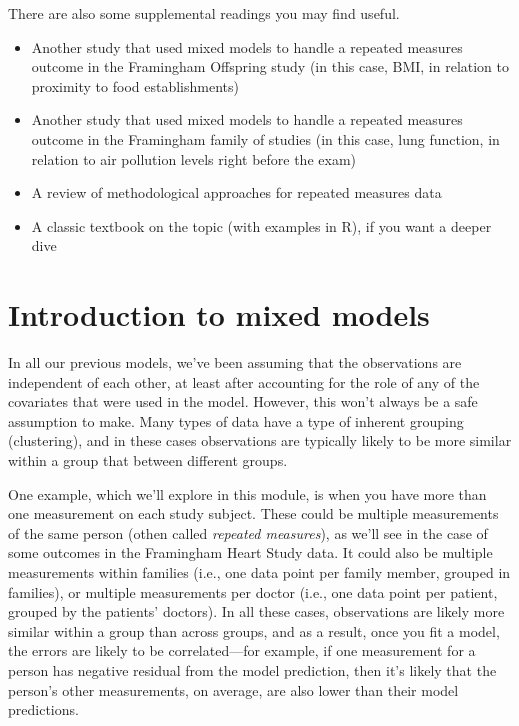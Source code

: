 \documentclass[
]{book}
\providecommand{\tightlist}{%
  \setlength{\itemsep}{0pt}\setlength{\parskip}{0pt}}
\begin{document}
There are also some supplemental readings you may find useful.

\begin{itemize}
\tightlist
\item
  \citet{block2011proximity} Another study that used mixed models to handle a repeated
  measures outcome in the Framingham Offspring study (in this case, BMI, in
  relation to proximity to food establishments)
\item
  \citet{rice2013short} Another study that used mixed models to handle a repeated
  measures outcome in the Framingham family of studies (in this case, lung
  function, in relation to air pollution levels right before the exam)
\item
  \citet{gibbons2010advances} A review of methodological approaches for repeated
  measures data
\item
  \citet{gelman2006data} A classic textbook on the topic (with examples in R), if you
  want a deeper dive
\end{itemize}

\hypertarget{introduction-to-mixed-models}{%
\section{Introduction to mixed models}\label{introduction-to-mixed-models}}

In all our previous models, we've been assuming that the observations are
independent of each other, at least after accounting for the role of any
of the covariates that were used in the model. However, this won't always
be a safe assumption to make. Many types of data have a type of inherent
grouping (clustering), and in these cases observations are typically likely to be more
similar within a group that between different groups.

One example, which we'll explore in this module, is when you have more than one
measurement on each study subject. These could be multiple measurements of the
same person (othen called \emph{repeated measures}), as we'll see in the case of some
outcomes in the Framingham Heart Study data. It could also be multiple
measurements within families (i.e., one data point per family member, grouped in
families), or multiple measurements per doctor (i.e., one data point per
patient, grouped by the patients' doctors). In all these cases, observations
are likely more similar within a group than across groups, and as a result,
once you fit a model, the errors are likely to be correlated---for example,
if one measurement for a person has negative residual from the model prediction,
then it's likely that the person's other measurements, on average, are also
lower than their model predictions.
\end{document}
